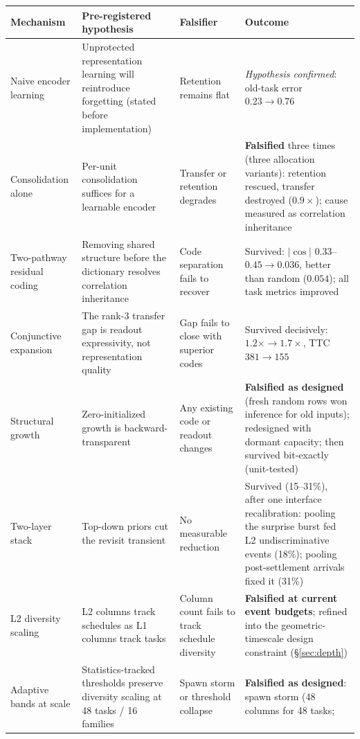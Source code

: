 \documentclass[11pt]{article}
\begin{document}
\begin{table}[ht]
\centering\small
\begin{tabular}{p{2.9cm} p{4.4cm} p{3.2cm} p{3.8cm}}
\toprule
\textbf{Mechanism} & \textbf{Pre-registered hypothesis} &
\textbf{Falsifier} & \textbf{Outcome}\\
\midrule
Naive encoder learning & Unprotected representation learning will
reintroduce forgetting (stated before implementation) & Retention remains
flat & \emph{Hypothesis confirmed}: old-task error $0.23 \to 0.76$\\
\addlinespace
Consolidation alone & Per-unit consolidation suffices for a learnable
encoder & Transfer or retention degrades & \textbf{Falsified} three times
(three allocation variants): retention rescued, transfer destroyed
($0.9\times$); cause measured as correlation inheritance\\
\addlinespace
Two-pathway residual coding & Removing shared structure before the
dictionary resolves correlation inheritance & Code separation fails to
recover & Survived: $|\!\cos\!|$ $0.33$--$0.45 \to 0.036$, better than
random ($0.054$); all task metrics improved\\
\addlinespace
Conjunctive expansion & The rank-3 transfer gap is readout expressivity,
not representation quality & Gap fails to close with superior codes &
Survived decisively: $1.2\times \to 1.7\times$, TTC $381 \to 155$\\
\addlinespace
Structural growth & Zero-initialized growth is backward-transparent &
Any existing code or readout changes & \textbf{Falsified as designed}
(fresh random rows won inference for old inputs); redesigned with dormant
capacity; then survived bit-exactly (unit-tested)\\
\addlinespace
Two-layer stack & Top-down priors cut the revisit transient & No
measurable reduction & Survived (15--31\%), after one interface
recalibration: pooling the surprise burst fed L2 undiscriminative events
(18\%); pooling post-settlement arrivals fixed it (31\%)\\
\addlinespace
L2 diversity scaling & L2 columns track schedules as L1 columns track
tasks & Column count fails to track schedule diversity & \textbf{Falsified
at current event budgets}; refined into the geometric-timescale design
constraint (\S\ref{sec:depth})\\
\addlinespace
Adaptive bands at scale & Statistics-tracked thresholds preserve diversity
scaling at 48 tasks / 16 families & Spawn storm or threshold collapse &
\textbf{Falsified as designed}: spawn storm (48 columns for 48 tasks;

\end{tabular}
\end{table}
\end{document}
